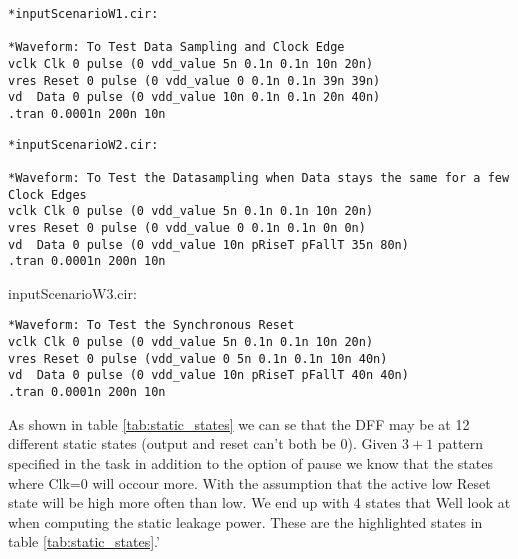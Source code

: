 \begin{lstlisting}
*inputScenarioW1.cir:

*Waveform: To Test Data Sampling and Clock Edge
vclk Clk 0 pulse (0 vdd_value 5n 0.1n 0.1n 10n 20n)     
vres Reset 0 pulse (0 vdd_value 0 0.1n 0.1n 39n 39n)       
vd  Data 0 pulse (0 vdd_value 10n 0.1n 0.1n 20n 40n)
.tran 0.0001n 200n 10n
\end{lstlisting}

\begin{lstlisting}
*inputScenarioW2.cir:

*Waveform: To Test the Datasampling when Data stays the same for a few Clock Edges
vclk Clk 0 pulse (0 vdd_value 5n 0.1n 0.1n 10n 20n)     
vres Reset 0 pulse (0 vdd_value 0 0.1n 0.1n 0n 0n)       
vd  Data 0 pulse (0 vdd_value 10n pRiseT pFallT 35n 80n)     
.tran 0.0001n 200n 10n
\end{lstlisting}

inputScenarioW3.cir:
\begin{lstlisting}
*Waveform: To Test the Synchronous Reset
vclk Clk 0 pulse (0 vdd_value 5n 0.1n 0.1n 10n 20n)     
vres Reset 0 pulse (vdd_value 0 5n 0.1n 0.1n 10n 40n)       
vd  Data 0 pulse (0 vdd_value 10n pRiseT pFallT 40n 40n)
.tran 0.0001n 200n 10n
\end{lstlisting}

As shown in table \ref{tab:static_states} we can se that the DFF may be at 12 different static states (output and reset can't both be 0). Given $3+1$ pattern specified in the task in addition to the option of pause we know that the states where Clk=0 will occour more. With the assumption that the active low Reset state will be high more often than low. We end up with 4 states that Well look at when computing the static leakage power. These are the highlighted states in table \ref{tab:static_states}.'

